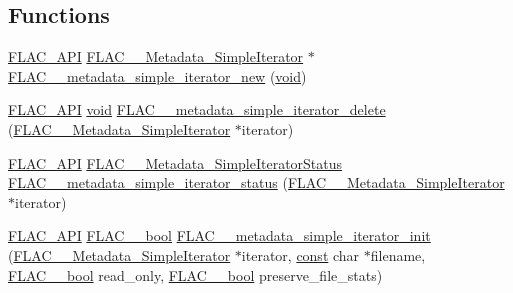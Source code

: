 \subsection*{Functions}
\begin{DoxyCompactItemize}
\item 
\hyperlink{group__flac__export_ga56ca07df8a23310707732b1c0007d6f5}{F\+L\+A\+C\+\_\+\+A\+PI} \hyperlink{group__flac__metadata__level1_ga6accccddbb867dfc2eece9ee3ffecb3a}{F\+L\+A\+C\+\_\+\+\_\+\+Metadata\+\_\+\+Simple\+Iterator} $\ast$ \hyperlink{group__flac__metadata__level1_ga5b32f4eba211e05727428e9080f4e393}{F\+L\+A\+C\+\_\+\+\_\+metadata\+\_\+simple\+\_\+iterator\+\_\+new} (\hyperlink{png_8h_ac9c84fa68bbad002983e35ce3663c686}{void})
\item 
\hyperlink{group__flac__export_ga56ca07df8a23310707732b1c0007d6f5}{F\+L\+A\+C\+\_\+\+A\+PI} \hyperlink{png_8h_ac9c84fa68bbad002983e35ce3663c686}{void} \hyperlink{group__flac__metadata__level1_ga46e64734300a022bb9616b26228b0348}{F\+L\+A\+C\+\_\+\+\_\+metadata\+\_\+simple\+\_\+iterator\+\_\+delete} (\hyperlink{group__flac__metadata__level1_ga6accccddbb867dfc2eece9ee3ffecb3a}{F\+L\+A\+C\+\_\+\+\_\+\+Metadata\+\_\+\+Simple\+Iterator} $\ast$iterator)
\item 
\hyperlink{group__flac__export_ga56ca07df8a23310707732b1c0007d6f5}{F\+L\+A\+C\+\_\+\+A\+PI} \hyperlink{group__flac__metadata__level1_gac926e7d2773a05066115cac9048bbec9}{F\+L\+A\+C\+\_\+\+\_\+\+Metadata\+\_\+\+Simple\+Iterator\+Status} \hyperlink{group__flac__metadata__level1_ga68cfafa2323154f3ee1d3061eafe109f}{F\+L\+A\+C\+\_\+\+\_\+metadata\+\_\+simple\+\_\+iterator\+\_\+status} (\hyperlink{group__flac__metadata__level1_ga6accccddbb867dfc2eece9ee3ffecb3a}{F\+L\+A\+C\+\_\+\+\_\+\+Metadata\+\_\+\+Simple\+Iterator} $\ast$iterator)
\item 
\hyperlink{group__flac__export_ga56ca07df8a23310707732b1c0007d6f5}{F\+L\+A\+C\+\_\+\+A\+PI} \hyperlink{ordinals_8h_a95103469f1cbd78b8cf250194985b34e}{F\+L\+A\+C\+\_\+\+\_\+bool} \hyperlink{group__flac__metadata__level1_ga2a055cca4e6e06ae62517c8b0fa6e8a3}{F\+L\+A\+C\+\_\+\+\_\+metadata\+\_\+simple\+\_\+iterator\+\_\+init} (\hyperlink{group__flac__metadata__level1_ga6accccddbb867dfc2eece9ee3ffecb3a}{F\+L\+A\+C\+\_\+\+\_\+\+Metadata\+\_\+\+Simple\+Iterator} $\ast$iterator, \hyperlink{zconf_8h_a2c212835823e3c54a8ab6d95c652660e}{const} char $\ast$filename, \hyperlink{ordinals_8h_a95103469f1cbd78b8cf250194985b34e}{F\+L\+A\+C\+\_\+\+\_\+bool} read\+\_\+only, \hyperlink{ordinals_8h_a95103469f1cbd78b8cf250194985b34e}{F\+L\+A\+C\+\_\+\+\_\+bool} preserve\+\_\+file\+\_\+stats)

\end{DoxyCompactItemize}
